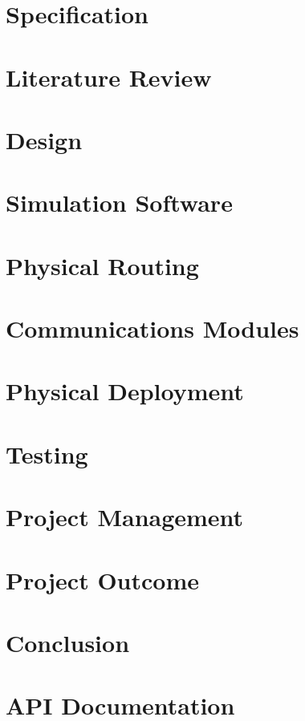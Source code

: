 \documentclass[10pt,a4paper,twoside]{report}
\begin{document}
\chapter{Specification}
	

\chapter{Literature Review}
		

\chapter{Design}
	

\chapter{Simulation Software}
	

\chapter{Physical Routing}
	

\chapter{Communications Modules}
	

\chapter{Physical Deployment}
	

\chapter{Testing}
	

\chapter{Project Management}
	

\chapter{Project Outcome}
	

\chapter{Conclusion}
	

\appendix
\chapter{API Documentation}




\end{document}
